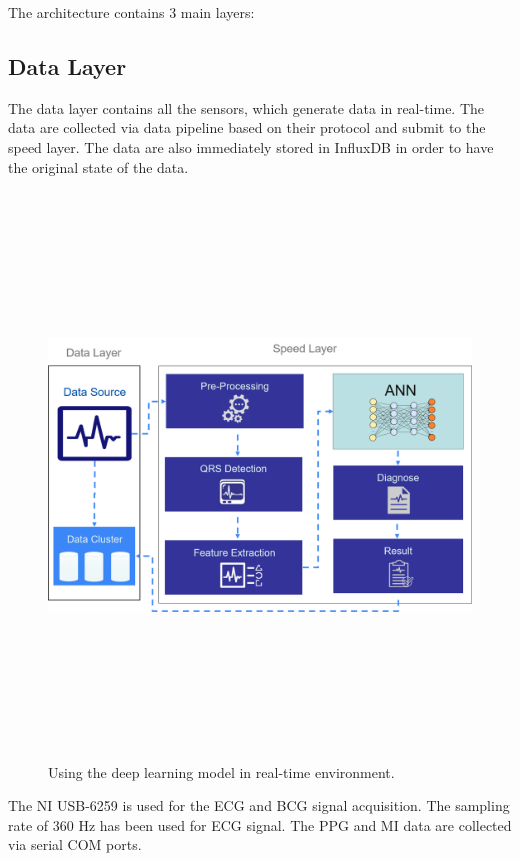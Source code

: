 The architecture contains 3 main layers:

\subsection{Data Layer}
The data layer contains all the sensors, which generate data in real-time. The data are collected via data pipeline based on their protocol and submit to the speed layer. The data are also immediately stored in InfluxDB in order to have the original state of the data.

\begin{figure}[htpb]
	\centering
	\includegraphics[width=16cm,height=15cm,keepaspectratio=true]{images/ann_usage_speed_layer.png}
	\caption{
		Using the deep learning model in real-time environment.
	}
	\label{fig:using_ann}
\end{figure}


The NI USB-6259 is used for the ECG and BCG signal acquisition. The sampling rate of 360 Hz has been used for ECG signal. The PPG and MI data are collected via serial COM ports.

